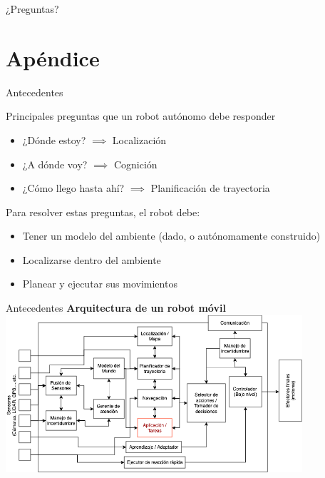 \documentclass[24pt,aspectratio=169]{beamer}
\begin{document}
\begin{frame}[standout]
  ¿Preguntas?
\end{frame}

\appendix

\section{Apéndice}

\begin{frame}[fragile]{Antecedentes}
  
  Principales preguntas que un robot autónomo debe responder \footnotemark\\
  \begin{itemize}
  \item ¿Dónde estoy? $\implies$ Localización 
  \item ¿A dónde voy? $\implies$ Cognición
  \item ¿Cómo llego hasta ahí? $\implies$ Planificación de trayectoria
  \end{itemize}
  Para resolver estas preguntas, el robot debe:\\
  \begin{itemize}
  \item Tener un modelo del ambiente (dado, o autónomamente construido)
  \item Localizarse dentro del ambiente
  \item Planear y ejecutar sus movimientos
  \end{itemize}

  
\end{frame}

\begin{frame}{Antecedentes}
  \centering
  \textbf{Arquitectura de un robot móvil}
  \bigskip %
  \includegraphics[width=11cm]{arquitectura_robots}\\
\end{frame}
\end{document}
